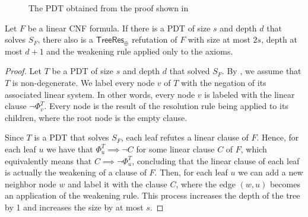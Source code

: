 \begin{figure}[H]
    \centering


    \caption{The PDT obtained from the proof shown in }
    \label{pdt_cnf}
\end{figure}

\begin{lemma}
    \label{pdt_to_resp}
 Let $F$ be a linear CNF formula. If there is a PDT of size $s$ and depth $d$ that solves $S_F$, there also is a $\mathsf{TreeRes}_\oplus$ refutation of $F$ with size at most $2s$, depth at most $d+1$ and the weakening rule applied only to the axioms.
\end{lemma}

\begin{proof}
 Let $T$ be a PDT of size $s$ and depth $d$ that solved $S_F$. By , we assume that $T$ is non-degenerate. We label every node $v$ of $T$ with the negation of its associated linear system. In other words, every node $v$ is labeled with the linear clause $\lnot \Phi_v^T$. Every node is the result of the resolution rule being applied to its children, where the root node is the empty clause.

 Since $T$ is a PDT that solves $S_F$, each leaf refutes a linear clause of $F$. Hence, for each leaf $u$ we have that $\Phi_{u}^T \implies \lnot C$ for some linear clause $C$ of $F$, which equivalently means that $C \implies \lnot \Phi_u^T$, concluding that the linear clause of each leaf is actually the weakening of a clause of $F$. Then, for each leaf $u$ we can add a new neighbor node $w$ and label it with the clause $C$, where the edge $(w,u)$ becomes an application of the weakening rule. This process increases the depth of the tree by 1 and increases the size by at most $s$.
\end{proof}

